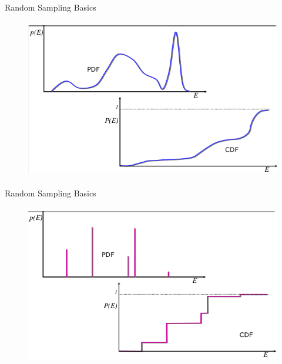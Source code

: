 \documentclass[xcolor=x11names,compress, handouts]{beamer}
\renewcommand{\(}{\begin{columns}}
\renewcommand{\)}{\end{columns}}
\newcommand{\<}[1]{\begin{column}{#1}}
\renewcommand{\>}{\end{column}}
\begin{document}
\begin{frame}{Random Sampling Basics}

  	\begin{figure}
  	\begin{center}
  		\includegraphics[height=2.75in,clip]{../figs/cont-pdf-cdf-3}
	\end{center}
  	\end{figure}

\end{frame}

\begin{frame}{Random Sampling Basics}

  	\begin{figure}
  	\begin{center}
  		\includegraphics[height=2.75in,clip]{../figs/disc-pdf-cdf}
	\end{center}
  	\end{figure}

\end{frame}
\end{document}
